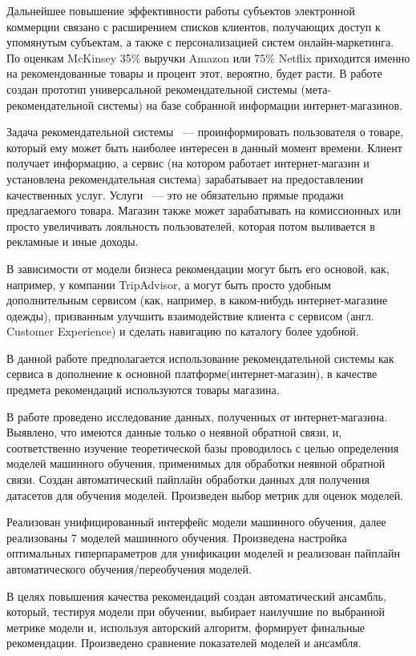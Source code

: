 \documentclass[14pt]{mmcs_article}
\begin{document}
Дальнейшее повышение эффективности работы субъектов электронной коммерции связано с расширением списков клиентов, получающих доступ к упомянутым субъектам, а также с персонализацией систем онлайн-маркетинга. По оценкам McKinsey \cite{INTRO:a1} 35\% выручки Amazon или 75\% Netflix приходится именно на рекомендованные товары и процент этот, вероятно, будет расти. В работе создан прототип универсальной рекомендательной системы (мета-рекомендательной системы) на базе собранной информации интернет-магазинов. 

Задача рекомендательной системы ~--- проинформировать пользователя о товаре, который ему может быть наиболее интересен в данный момент времени. Клиент получает информацию, а сервис (на котором работает интернет-магазин и установлена рекомендательная система) зарабатывает на предоставлении качественных услуг. Услуги ~--- это не обязательно прямые продажи предлагаемого товара. Магазин также может зарабатывать на комиссионных или просто увеличивать лояльность пользователей, которая потом выливается в рекламные и иные доходы.

В зависимости от модели бизнеса рекомендации могут быть его основой, как, например, у компании TripAdvisor, а могут быть просто удобным дополнительным сервисом (как, например, в каком-нибудь интернет-магазине одежды), призванным улучшить взаимодействие клиента с сервисом (англ. Customer Experience) и сделать навигацию по каталогу более удобной. 

В данной работе предполагается использование рекомендательной системы  как сервиса в дополнение к основной платформе(интернет-магазин), в качестве предмета рекомендаций используются товары магазина. 

В работе проведено исследование данных, полученных от интернет-магазина. Выявлено, что имеются данные только о неявной обратной связи, и, соответственно изучение теоретической базы проводилось с целью определения  моделей машинного обучения, применимых для обработки неявной обратной связи. Создан автоматический  пайплайн обработки данных для получения датасетов для обучения моделей. Произведен выбор метрик для оценок моделей.

Реализован унифицированный интерфейс модели машинного обучения, далее реализованы 7 моделей машинного обучения. Произведена настройка оптимальных гиперпараметров для унификации моделей и реализован пайплайн автоматического обучения/переобучения моделей.

В целях повышения качества рекомендаций создан автоматический ансамбль, который, тестируя модели при обучении, выбирает наилучшие по выбранной метрике модели и, используя авторский алгоритм, формирует финальные рекомендации. Произведено сравнение показателей моделей и ансамбля.
\end{document}
